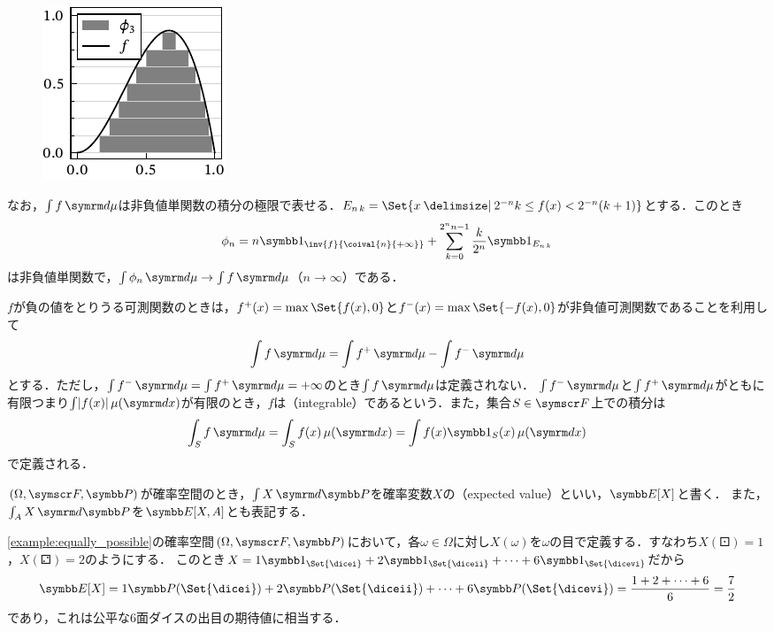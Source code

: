 \documentclass[../../main]{subfiles}
\begin{document}
\begin{figure}
  \includegraphics{figures/integration.pdf}
\end{figure}

なお，\(\int f\measured{\mu}\)は非負値単関数の積分の極限で表せる．\(\midx{E}{n}{k}=\Set{x\given 2^{-n}k\leq f(x)<2^{-n}(k+1)}\)とする．このとき
\[
  \phi_n = n\indicator_{\inv{f}{\coival{n}{+\infty}}}+\sum_{k=0}^{2^nn-1}\frac{k}{2^n}\indicator_{\midx{E}{n}{k}}
\]
は非負値単関数で，\(\int\phi_n\measured{\mu}\to\int f\measured{\mu}\)（\(n\to\infty\)）である．

\(f\)が負の値をとりうる可測関数のときは，\(f^{\mathord{+}}(x)=\max\Set{f(x),0}\)と\(f^{\mathord{-}}(x)=\max\Set{-f(x),0}\)が非負値可測関数であることを利用して
\[
  \int f\measured{\mu} = \int f^{\mathord{+}}\measured{\mu}-\int f^{\mathord{-}}\measured{\mu}
\]
とする．ただし，\(\int f^{\mathord{-}}\measured{\mu}=\int f^{\mathord{+}}\measured{\mu}=+\infty\)のとき\(\int f\measured{\mu}\)は定義されない．
\(\int f^{\mathord{-}}\measured{\mu}\)と\(\int f^{\mathord{+}}\measured{\mu}\)がともに有限\texttwoemdash つまり\(\int\abs{f(x)}\measured[x]{\mu}\)が有限\texttwoemdash のとき，\(f\)は（integrable）であるという．また，集合\(S\in\sigmaalg{F}\)上での積分は
\[
  \int_Sf\measured{\mu} = \int_Sf(x)\measured[x]{\mu}
  = \int f(x)\indicator_S(x)\measured[x]{\mu}
\]
で定義される．

\((\Omega,\sigmaalg{F},\prob)\)が確率空間のとき，\(\int X\measured{\prob}\)を確率変数\(X\)の（expected value）といい，\(\expval[X]\)と書く．
また，\(\int_AX\measured{\prob}\)を\(\expval[X,A]\)とも表記する．

\begin{example}
  \cref{example:equally_possible}の確率空間\((\Omega,\sigmaalg{F},\prob)\)において，各\(\omega\in\Omega\)に対し\(X(\omega)\)を\(\omega\)の目で定義する．すなわち\(X(\dicei)=1\)，\(X(\diceii)=2\)のようにする．
  このとき\(X=1\indicator_{\Set{\dicei}}+2\indicator_{\Set{\diceii}}+\dots+6\indicator_{\Set{\dicevi}}\)だから
  \[
    \expval[X] = 1\prob({\Set{\dicei}})+2\prob(\Set{\diceii})+\dots+6\prob({\Set{\dicevi}})
    = \frac{1+2+\dots+6}{6}
    = \frac{7}{2}
  \]
  であり，これは公平な6面ダイスの出目の期待値に相当する．
\end{example}
\end{document}
